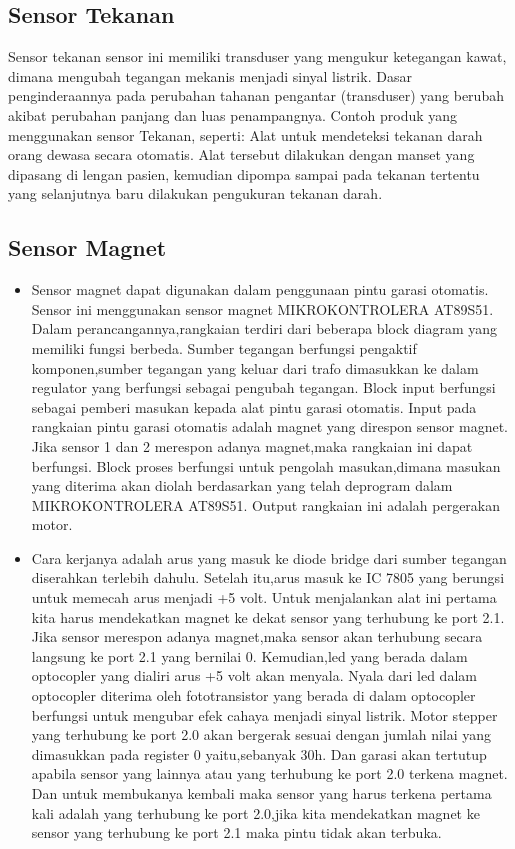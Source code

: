 \subsection{Sensor Tekanan}
Sensor tekanan sensor ini memiliki transduser yang mengukur ketegangan kawat, dimana mengubah tegangan mekanis menjadi sinyal listrik. Dasar penginderaannya pada perubahan tahanan pengantar (transduser) yang berubah akibat perubahan panjang dan luas penampangnya. Contoh produk yang menggunakan sensor Tekanan, seperti: Alat untuk mendeteksi tekanan darah orang dewasa secara otomatis. Alat tersebut dilakukan dengan manset yang dipasang di lengan pasien, kemudian dipompa sampai pada tekanan tertentu yang selanjutnya baru dilakukan pengukuran tekanan darah.
	
\subsection{Sensor Magnet}
	\begin	{itemize}
	\item Sensor magnet dapat digunakan dalam penggunaan pintu garasi otomatis. Sensor ini menggunakan sensor magnet MIKROKONTROLERA AT89S51. Dalam perancangannya,rangkaian terdiri dari beberapa block diagram yang memiliki fungsi berbeda. Sumber tegangan berfungsi pengaktif komponen,sumber tegangan yang keluar dari trafo dimasukkan ke dalam regulator yang berfungsi sebagai pengubah tegangan. Block input berfungsi sebagai pemberi masukan kepada alat pintu garasi otomatis. Input pada rangkaian pintu garasi otomatis adalah magnet yang direspon sensor magnet. Jika sensor 1 dan 2 merespon adanya magnet,maka rangkaian ini dapat berfungsi. Block proses berfungsi untuk pengolah masukan,dimana masukan yang diterima akan diolah berdasarkan yang telah deprogram dalam MIKROKONTROLERA AT89S51. Output rangkaian ini adalah pergerakan motor. 
	\item Cara kerjanya adalah arus yang masuk ke diode bridge dari sumber tegangan diserahkan terlebih dahulu. Setelah itu,arus masuk  ke IC 7805 yang berungsi untuk memecah arus menjadi +5 volt. Untuk menjalankan alat ini pertama kita harus mendekatkan magnet ke dekat sensor yang terhubung ke port 2.1. Jika sensor merespon adanya magnet,maka sensor akan terhubung secara langsung ke port 2.1 yang bernilai 0. Kemudian,led yang berada dalam optocopler yang dialiri arus +5 volt akan menyala. Nyala dari led dalam optocopler diterima oleh fototransistor yang berada di dalam optocopler berfungsi untuk mengubar efek cahaya menjadi sinyal listrik.
		  Motor stepper yang terhubung ke port 2.0 akan bergerak sesuai dengan jumlah nilai yang dimasukkan pada register 0 yaitu,sebanyak 30h. Dan garasi akan tertutup apabila sensor yang lainnya atau yang terhubung ke port 2.0 terkena magnet. Dan untuk membukanya kembali maka sensor yang harus terkena pertama kali adalah yang terhubung ke port 2.0,jika kita mendekatkan magnet ke sensor yang terhubung  ke port 2.1 maka pintu tidak akan terbuka.
	\end{itemize}